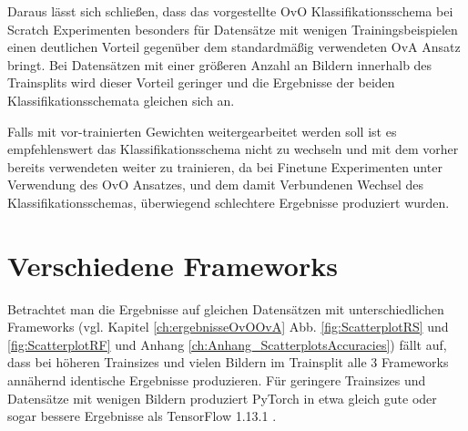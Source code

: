 Daraus lässt sich schließen, dass das vorgestellte OvO Klassifikationsschema bei Scratch Experimenten besonders für Datensätze mit wenigen Trainingsbeispielen einen deutlichen Vorteil gegenüber dem standardmäßig verwendeten OvA Ansatz bringt. Bei Datensätzen mit einer größeren Anzahl an Bildern innerhalb des Trainsplits wird dieser Vorteil geringer und die Ergebnisse der beiden Klassifikationsschemata gleichen sich an.


Falls mit vor-trainierten Gewichten weitergearbeitet werden soll ist es empfehlenswert das Klassifikationsschema nicht zu wechseln und mit dem vorher bereits verwendeten weiter zu trainieren, da bei Finetune Experimenten unter Verwendung des OvO Ansatzes, und dem damit Verbundenen Wechsel des Klassifikationsschemas, überwiegend schlechtere Ergebnisse produziert wurden.


\section{Verschiedene Frameworks}
\label{ch:diskussionFrameworks}

Betrachtet man die Ergebnisse auf gleichen Datensätzen mit unterschiedlichen Frameworks (vgl. Kapitel \ref{ch:ergebnisseOvOOvA} Abb. \ref{fig:ScatterplotRS} und \ref{fig:ScatterplotRF} und Anhang \ref{ch:Anhang_ScatterplotsAccuracies}) fällt auf, dass bei höheren Trainsizes und vielen Bildern im Trainsplit alle 3 Frameworks annähernd identische Ergebnisse produzieren. Für geringere Trainsizes und Datensätze mit wenigen Bildern 
produziert PyTorch \cite{pytorch} in etwa gleich gute oder sogar bessere Ergebnisse als TensorFlow 1.13.1 \cite{tensorflow}. 


